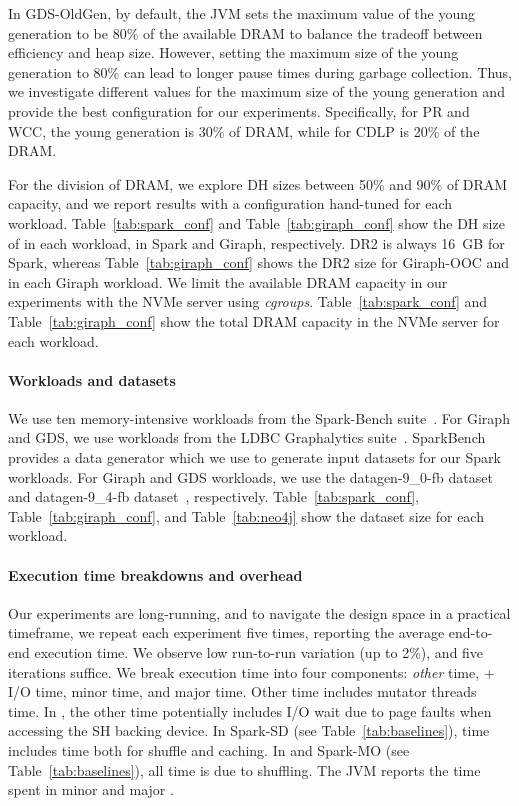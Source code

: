 In GDS-OldGen, by default, the JVM sets the maximum value of the young
generation to be 80\% of the available DRAM to balance the tradeoff
between \teraheapGC efficiency and heap size. However, setting the maximum
size of the young generation to 80\% can lead to longer pause times
during garbage collection. Thus, we investigate different values for
the maximum size of the young generation and provide the best
configuration for our experiments. Specifically, for PR and WCC, the
young generation is 30\% of DRAM, while for CDLP is 20\% of the DRAM.

For the division of DRAM, we explore DH sizes between 50\% and 90\% of
DRAM capacity, and we report results with a configuration hand-tuned
for each workload. Table~\ref{tab:spark_conf} and
Table~\ref{tab:giraph_conf} show the DH size of \teraheapName{} in each
workload, in Spark and Giraph, respectively. DR2 is always \SI{16}{GB}
for Spark, whereas Table~\ref{tab:giraph_conf} shows the DR2 size for
Giraph-OOC and \teraheapName{} in each Giraph workload. We limit the available
DRAM capacity in our experiments with the NVMe server using
\emph{cgroups}. Table~\ref{tab:spark_conf} and
Table~\ref{tab:giraph_conf} show the total DRAM capacity in the NVMe
server for each workload.

\paragraph{\textbf{Workloads and datasets}}
We use ten memory-intensive workloads from the Spark-Bench
suite~\cite{Li:SparkBench}. For Giraph and GDS, we use workloads from the LDBC
Graphalytics suite~\cite{iosup:ldbc}. SparkBench provides a data generator which
we use to generate input datasets for our Spark workloads. For Giraph and GDS
workloads, we use the datagen-9\_0-fb dataset~\cite{iosup:ldbc} and
datagen-9\_4-fb dataset~\cite{iosup:ldbc}, respectively.
Table~\ref{tab:spark_conf}, Table~\ref{tab:giraph_conf}, and
Table~\ref{tab:neo4j} show the dataset size for each workload.

\paragraph{\textbf{Execution time breakdowns and \teraheapSD overhead}}
Our experiments are long-running, and to navigate the design space in a
practical timeframe, we repeat each experiment five times, reporting the average
end-to-end execution time. We observe low run-to-run variation (up to 2\%), and
five iterations suffice. We break execution time into four components:
\emph{other} time, \teraheapSD + I/O time, minor \teraheapGC time, and major \teraheapGC time. Other
time includes mutator threads time. In \teraheapName{}, the other time potentially
includes I/O wait due to page faults when accessing the SH backing device. In
Spark-SD (see Table~\ref{tab:baselines}), \teraheapSD time includes \teraheapSD time both for
shuffle and caching. In \teraheapName{} and Spark-MO (see Table~\ref{tab:baselines}),
all \teraheapSD time is due to shuffling. The JVM reports the time spent in minor and
major \teraheapGC.

